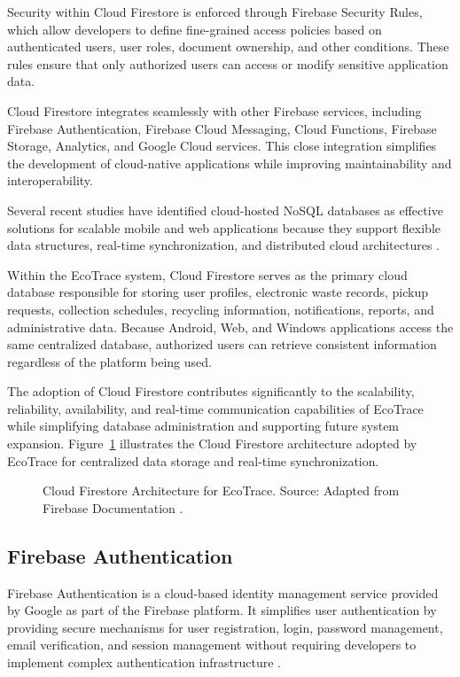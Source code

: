 Security within Cloud Firestore is enforced through Firebase Security Rules,
which allow developers to define fine-grained access policies based on
authenticated users, user roles, document ownership, and other conditions. These
rules ensure that only authorized users can access or modify sensitive application
data.

Cloud Firestore integrates seamlessly with other Firebase services, including
Firebase Authentication, Firebase Cloud Messaging, Cloud Functions, Firebase
Storage, Analytics, and Google Cloud services. This close integration simplifies the
development of cloud-native applications while improving maintainability and
interoperability.

Several recent studies have identified cloud-hosted NoSQL databases as
effective solutions for scalable mobile and web applications because they support
flexible data structures, real-time synchronization, and distributed cloud
architectures \citep{li2022,nayak2021}.

Within the EcoTrace system, Cloud Firestore serves as the primary cloud
database responsible for storing user profiles, electronic waste records, pickup
requests, collection schedules, recycling information, notifications, reports, and
administrative data. Because Android, Web, and Windows applications access the
same centralized database, authorized users can retrieve consistent information
regardless of the platform being used.

The adoption of Cloud Firestore contributes significantly to the scalability,
reliability, availability, and real-time communication capabilities of EcoTrace while
simplifying database administration and supporting future system expansion.
Figure~\ref{fig:firestore-arch} illustrates the Cloud Firestore architecture adopted
by EcoTrace for centralized data storage and real-time synchronization.

\begin{figure}[H]
  \centering
  \caption{Cloud Firestore Architecture for EcoTrace. Source: Adapted from Firebase Documentation \citep{firebase2025firestore}.}
  \label{fig:firestore-arch}
\end{figure}

\subsection{Firebase Authentication}

Firebase Authentication is a cloud-based identity management service provided by
Google as part of the Firebase platform. It simplifies user authentication by
providing secure mechanisms for user registration, login, password management,
email verification, and session management without requiring developers to
implement complex authentication infrastructure \citep{firebase2025auth}.

